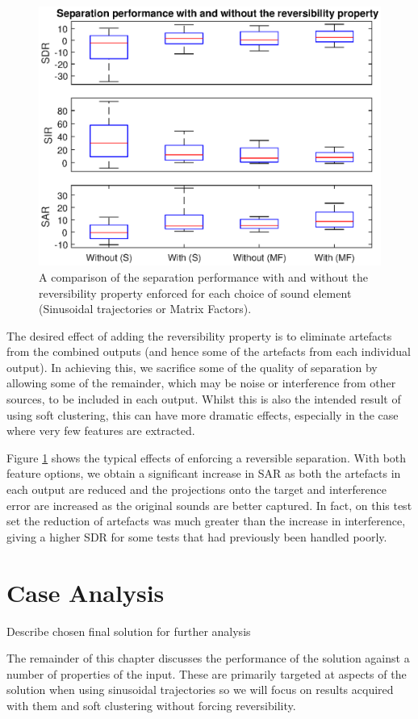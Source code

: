 \documentclass[10pt,twoside,a4paper]{report}
\begin{document}
\begin{figure}
\centering
\includegraphics[width=0.7\linewidth]{./ReversibleCompBoxPlots}
\caption{A comparison of the separation performance with and without the reversibility property enforced for each choice of sound element (Sinusoidal trajectories or Matrix Factors).}
\label{fig:ReversibleCompBoxPlots}
\end{figure}

The desired effect of adding the reversibility property is to eliminate artefacts from the combined outputs (and hence some of the artefacts from each individual output). In achieving this, we sacrifice some of the quality of separation by allowing some of the remainder, which may be noise or interference from other sources, to be included in each output. Whilst this is also the intended result of using soft clustering, this can have more dramatic effects, especially in the case where very few features are extracted.

Figure \ref{fig:ReversibleCompBoxPlots} shows the typical effects of enforcing a reversible separation. With both feature options, we obtain a significant increase in SAR as both the artefacts in each output are reduced and the projections onto the target and interference error are increased as the original sounds are better captured. In fact, on this test set the reduction of artefacts was much greater than the increase in interference, giving a higher SDR for some tests that had previously been handled poorly.

\section{Case Analysis}

Describe chosen final solution for further analysis

The remainder of this chapter discusses the performance of the solution against a number of properties of the input. These are primarily targeted at aspects of the solution when using sinusoidal trajectories so we will focus on results acquired with them and soft clustering without forcing reversibility.
\end{document}
